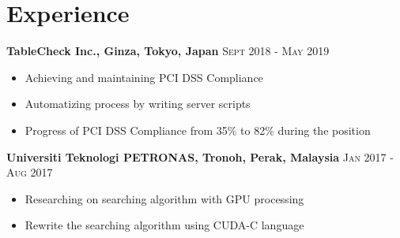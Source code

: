 \documentclass[English]{cv-style}
\begin{document}
\section{Experience}
\vspace{-0.3cm}
\textbf{TableCheck Inc., Ginza, Tokyo, Japan} 
    \quad \quad \quad \quad \quad \quad \quad \quad \quad 
    \quad \quad \quad \quad \quad \quad \quad \quad
\textsc{Sept 2018 - May 2019} \\
 \vspace{-0.15cm}
    \begin{itemize}[noitemsep]
        \item Achieving and maintaining PCI DSS Compliance
        \item Automatizing process by writing server scripts
        \item Progress of PCI DSS Compliance from 35\% to 82\% during the position
    \end{itemize}
\textbf{Universiti Teknologi PETRONAS, Tronoh, Perak, Malaysia} 
    \quad \quad \quad \quad \quad \quad \quad \quad \quad 
\textsc{Jan 2017 - Aug 2017} \\
 \vspace{-0.15cm}
    \begin{itemize}[noitemsep]
        \item Researching on searching algorithm with GPU processing
        \item Rewrite the searching algorithm using CUDA-C language
    \end{itemize}
\end{document}
